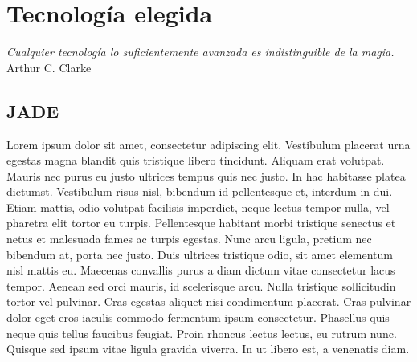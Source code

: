 
\chapter*{Tecnología elegida} \label{cap4}


\begin{flushright}
\begin{minipage}{7.85cm}
    {\em Cualquier tecnología lo suficientemente avanzada es indistinguible de
    la magia.} \\ Arthur C. Clarke
\end{minipage}
\end{flushright}

\vspace*{5mm}

\section*{JADE}

Lorem ipsum dolor sit amet, consectetur adipiscing elit. Vestibulum placerat
urna egestas magna blandit quis tristique libero tincidunt. Aliquam erat
volutpat. Mauris nec purus eu justo ultrices tempus quis nec justo. In hac
habitasse platea dictumst. Vestibulum risus nisl, bibendum id pellentesque et,
interdum in dui. Etiam mattis, odio volutpat facilisis imperdiet, neque lectus
tempor nulla, vel pharetra elit tortor eu turpis. Pellentesque habitant morbi
tristique senectus et netus et malesuada fames ac turpis egestas. Nunc arcu
ligula, pretium nec bibendum at, porta nec justo. Duis ultrices tristique odio,
sit amet elementum nisl mattis eu. Maecenas convallis purus a diam dictum vitae
consectetur lacus tempor. Aenean sed orci mauris, id scelerisque arcu. Nulla
tristique sollicitudin tortor vel pulvinar. Cras egestas aliquet nisi
condimentum placerat. Cras pulvinar dolor eget eros iaculis commodo fermentum
ipsum consectetur. Phasellus quis neque quis tellus faucibus feugiat. Proin
rhoncus lectus lectus, eu rutrum nunc. Quisque sed ipsum vitae ligula gravida
viverra. In ut libero est, a venenatis diam.

